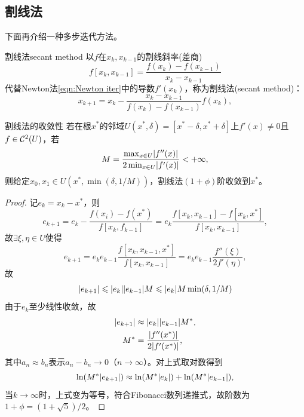 \subsection{割线法}

下面再介绍一种多步迭代方法。

\begin{theorem}
    {割线法}{secant method}
    以$f$在$x_k,x_{k-1}$的割线斜率(差商)
    \begin{equation}\label{eq:na-secant-slope}
        f[x_k,x_{k-1}] = \frac{f(x_k) - f(x_{k-1})}{x_k - x_{k-1}}
    \end{equation}
    代替Newton法\eqref{eqn:Newton iter}中的导数$f'(x_k)$，称为割线法(secant method)：
    \begin{equation}
        \label{eqn:secant line}
        x_{k+1} = x_k - \frac{x_k - x_{k-1}}{f(x_k) - f(x_{k-1})}f(x_k),
    \end{equation}
\end{theorem}

\begin{theorem}
    {割线法的收敛性}{}
    若在根$x^*$的邻域$U(x^*,\delta) = [x^* - \delta,x^* + \delta]$上$f'(x) \neq 0$且$f \in \mathcal{C}^2(U)$，若
    \[
        M = \frac{\max_{x\in U}\lvert f''(x)\rvert}{2\min_{x\in U}\lvert f'(x)\rvert} < +\infty,
    \]
    则给定$x_0,x_1 \in U(x^*,\min(\delta,1/M))$，割线法$(1 + \phi)$阶收敛到$x^*$。
\end{theorem}

\begin{proof}
    记$e_k = x_k - x^*$，则
    \[
        e_{k+1} = e_k - \frac{f(x_i) - f(x^*)}{f[x_k,f_{k-1}]} = e_k\frac{f[x_k,x_{k-1}] - f[x_k,x^*]}{f[x_k,x_{k-1}]},
    \]
    故$\exists\xi,\eta \in U$使得
    \[
        e_{k+1} = e_ke_{k-1}\frac{f[x_k,x_{k-1},x^*]}{f[x_k,x_{k-1}]} = e_ke_{k-1}\frac{f''(\xi)}{2f'(\eta)},
    \]
    故
    \[
        \lvert e_{k+1}\rvert \leqslant \lvert e_k\rvert\lvert e_{k-1}\rvert M \leqslant \lvert e_k\rvert M\min(\delta,1/M)
    \]
    由于$e_k$至少线性收敛，故 %
    \begin{align*}
        \lvert e_{k+1}\rvert &\approx \lvert e_k\rvert\lvert e_{k-1}\rvert M^*,\\
        M^* &= \frac{\lvert f''(x^*)\rvert}{2\lvert f'(x^*)\rvert},
    \end{align*}
    其中$a_n \approx b_n$表示$a_n - b_n \to 0$（$n \to \infty$）。对上式取对数得到
    \[
        \ln(M^*\lvert e_{k+1}\rvert) \approx \ln(M^*\lvert e_k\rvert) + \ln(M^*\lvert e_{k-1}\rvert),
    \]
    当$k \to \infty$时，上式变为等号，符合Fibonacci数列递推式，故阶数为$1 + \phi = (1 + \sqrt5)/2$。
\end{proof}

